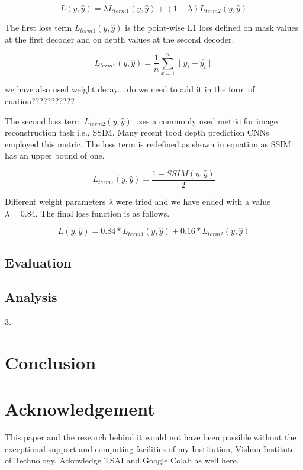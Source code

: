 \documentclass{article}
\begin{document}
\begin{equation}
L(y, \hat{y}) = \lambda L_{term1}(y, \hat{y}) + (1 - \lambda) L_{term2}(y, \hat{y})
\end{equation}

The first loss term $L_{term1}(y, \hat{y})$ is the point-wise L1 loss defined on mask values at the first decoder and 
on depth values at the second decoder.

\begin{equation}
L_{term1}(y, \hat{y}) = \frac{1}{n} \sum_{x=1}^{n} \mid y_i - \hat{y_i} \mid
\end{equation}

we have also used weight decay... do we need to add it in the form of euation???????????

The second loss term $L_{term2}(y, \hat{y})$ uses a commonly used metric for image reconstruction task i.e., SSIM. 
Many recent tood depth prediction CNNs employed this metric. 
The loss term is redefined as shown in equation as SSIM has an upper bound of one.

\begin{equation}
L_{term1}(y, \hat{y}) = \frac{1 - SSIM(y, \hat{y})}{2}
\end{equation}

Different weight parameters $\lambda$ were tried and we have ended with a value $\lambda = 0.84$. The final loss function is as follows.

\begin{equation}
L(y, \hat{y}) = 0.84 \ast L_{term1}(y, \hat{y}) + 0.16 \ast L_{term2}(y, \hat{y})
\end{equation}

\subsection{Evaluation}
\subsection{Analysis}

3. 
\section{Conclusion}
\section{Acknowledgement}
This paper and the research behind it would not have been possible without the exceptional support and computing 
facilities of my Institution, Vishnu Institute of Technology. Ackowledge TSAI and Google Colab as well here.
\end{document}
